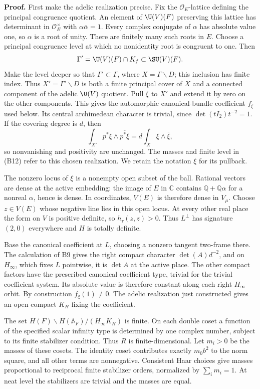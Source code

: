 \documentclass[11pt]{article}
\newcommand{\Q}{\mathbb Q}\newcommand{\C}{\mathbb C}\newcommand{\Z}{\mathbb Z}\newcommand{\R}{\mathbb R}\newcommand{\A}{\mathbb A}\newcommand{\OO}{\mathcal O}
\theoremstyle{definition}\newtheorem{definition}[theorem]{Definition}\newtheorem{remark}[theorem]{Remark}
\begin{document}
\textbf{Proof.} First make the adelic realization precise. Fix the $\mathcal O_E$-lattice defining the principal congruence quotient. An element of $\U(V)(F)$ preserving this lattice has determinant in $\mathcal O_E^\times$ with $\alpha\overline\alpha=1$. Every complex conjugate of $\alpha$ has absolute value one, so $\alpha$ is a root of unity. There are finitely many such roots in $E$. Choose a principal congruence level at which no nonidentity root is congruent to one. Then
\[
 \Gamma'=\U(V)(F)\cap K_f\subset\SU(V)(F).
\]
Make the level deeper so that $\Gamma'\subset\Gamma$, where $X=\Gamma\backslash D$; this inclusion has finite index. Thus $X'=\Gamma'\backslash D$ is both a finite principal cover of $X$ and a connected component of the adelic $\U(V)$ quotient. Pull $\xi$ to $X'$ and extend it by zero on the other components. This gives the automorphic canonical-bundle coefficient $f_\xi$ used below. Its central archimedean character is trivial, since $\det(tI_2)t^{-2}=1$. If the covering degree is $d$, then
\[
 \int_{X'}p^*\xi\wedge\overline{p^*\xi}
       =d\int_X\xi\wedge\overline\xi,
\]
so nonvanishing and positivity are unchanged. The masses and finite level in (B12) refer to this chosen realization. We retain the notation $\xi$ for its pullback.

The nonzero locus of $\xi$ is a nonempty open subset of the ball. Rational vectors are dense at the active embedding: the image of $E$ in $\C$ contains $\Q+\Q\alpha$ for a nonreal $\alpha$, hence is dense. In coordinates, $V(E)$ is therefore dense in $V_\mu$. Choose $z\in V(E)$ whose negative line lies in this open locus. At every other real place the form on $V$ is positive definite, so $h_\tau(z,z)>0$. Thus $L^\perp$ has signature $(2,0)$ everywhere and $H$ is totally definite.

Base the canonical coefficient at $L$, choosing a nonzero tangent two-frame there. The calculation of B9 gives the right compact character $\det(A)d^{-2}$, and on $H_\infty$, which fixes $L$ pointwise, it is $\det A$ at the active place. The other compact factors have the prescribed canonical coefficient type, trivial for the trivial coefficient system. Its absolute value is therefore constant along each right $H_\infty$ orbit. By construction $f_\xi(1)\ne0$. The adelic realization just constructed gives an open compact $K_H$ fixing the coefficient.

The set $H(F)\backslash H(\A_F)/(H_\infty K_H)$ is finite. On each double coset a function of the specified scalar infinity type is determined by one complex number, subject to its finite stabilizer condition. Thus $R$ is finite-dimensional. Let $m_i>0$ be the masses of these cosets. The identity coset contributes exactly $m_0b^2$ to the norm square, and all other terms are nonnegative. Consistent Haar choices give masses proportional to reciprocal finite stabilizer orders, normalized by $\sum_i m_i=1$. At neat level the stabilizers are trivial and the masses are equal.
\end{document}
